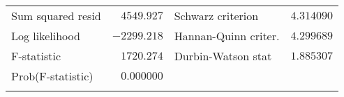 \documentclass[12pt]{article}
\numberwithin{equation}{section} %
\begin{document}
\begin{table}[!htbp]
\begin{tabular}{lrrrr}
\multicolumn{1}{l}{Sum squared resid}&\multicolumn{1}{r}{$4549.927$}&\multicolumn{2}{l}{Schwarz criterion}&\multicolumn{1}{r}{$4.314090$}\\
\multicolumn{1}{l}{Log likelihood}&\multicolumn{1}{r}{$-2299.218$}&\multicolumn{2}{l}{Hannan-Quinn criter.}&\multicolumn{1}{r}{$4.299689$}\\
\multicolumn{1}{l}{F-statistic}&\multicolumn{1}{r}{$1720.274$}&\multicolumn{2}{l}{Durbin-Watson stat}&\multicolumn{1}{r}{$1.885307$}\\
\multicolumn{1}{l}{Prob(F-statistic)}&\multicolumn{1}{r}{$0.000000$}&\multicolumn{1}{c}{}&\multicolumn{1}{c}{}&\multicolumn{1}{c}{}\\
[4.5pt] \hline \\ [-4.5pt]
\end{tabular}
\end{table}
\end{document}
